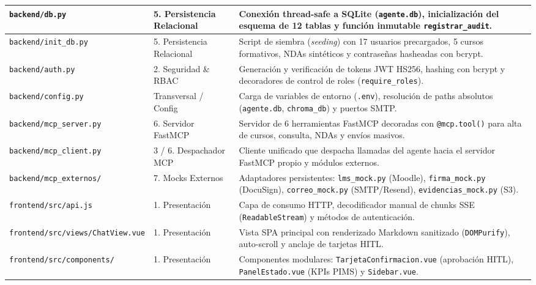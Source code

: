 \documentclass[11pt,a4paper]{article}
\begin{document}
\begin{longtable}{@{}p{5cm}p{3.5cm}p{7.5cm}@{}}
\texttt{backend/db.py} & 5. Persistencia Relacional & Conexión thread-safe a SQLite (\texttt{agente.db}), inicialización del esquema de 12 tablas y función inmutable \texttt{registrar\_audit}. \\ \midrule
\texttt{backend/init\_db.py} & 5. Persistencia Relacional & Script de siembra (\textit{seeding}) con 17 usuarios precargados, 5 cursos formativos, NDAs sintéticos y contraseñas hasheadas con bcrypt. \\ \midrule
\texttt{backend/auth.py} & 2. Seguridad \& RBAC & Generación y verificación de tokens JWT HS256, hashing con bcrypt y decoradores de control de roles (\texttt{require\_roles}). \\ \midrule
\texttt{backend/config.py} & Transversal / Config & Carga de variables de entorno (\texttt{.env}), resolución de paths absolutos (\texttt{agente.db}, \texttt{chroma\_db}) y puertos SMTP. \\ \midrule
\texttt{backend/mcp\_server.py} & 6. Servidor FastMCP & Servidor de 6 herramientas FastMCP decoradas con \texttt{@mcp.tool()} para alta de cursos, consulta, NDAs y envíos masivos. \\ \midrule
\texttt{backend/mcp\_client.py} & 3 / 6. Despachador MCP & Cliente unificado que despacha llamadas del agente hacia el servidor FastMCP propio y módulos externos. \\ \midrule
\texttt{backend/mcp\_externos/} & 7. Mocks Externos & Adaptadores persistentes: \texttt{lms\_mock.py} (Moodle), \texttt{firma\_mock.py} (DocuSign), \texttt{correo\_mock.py} (SMTP/Resend), \texttt{evidencias\_mock.py} (S3). \\ \midrule
\texttt{frontend/src/api.js} & 1. Presentación & Capa de consumo HTTP, decodificador manual de chunks SSE (\texttt{ReadableStream}) y métodos de autenticación. \\ \midrule
\texttt{frontend/src/views/ChatView.vue} & 1. Presentación & Vista SPA principal con renderizado Markdown sanitizado (\texttt{DOMPurify}), auto-scroll y anclaje de tarjetas HITL. \\ \midrule
\texttt{frontend/src/components/} & 1. Presentación & Componentes modulares: \texttt{TarjetaConfirmacion.vue} (aprobación HITL), \texttt{PanelEstado.vue} (KPIs PIMS) y \texttt{Sidebar.vue}. \\ \bottomrule
\end{longtable}

\end{document}

